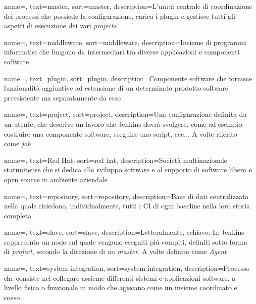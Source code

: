 {
    name=,
    text=master,
    sort=master,
    description={L'unità centrale di coordinazione dei processi che possiede la configurazione, carica i plugin e gestisce tutti gli aspetti di esecuzione dei vari \textit{projects}}
}

{
    name=,
    text=middleware,
    sort=middleware,
    description={Insieme di programmi informatici che fungono da intermediari tra diverse applicazioni e componenti software}
}

{
    name=,
    text=plugin,
    sort=plugin,
    description={Componente software che fornisce funzionalità aggiuntive ad estensione di un determinato prodotto software preesistente ma separatamente da esso}
}

{
    name=,
    text=project,
    sort=project,
    description={Una configurazione definita da un utente, che descrive un lavoro che Jenkins dovrà svolgere, come ad esempio costruire una componente software, eseguire uno script, ecc... A volte riferito come \textit{job}}
}

{
    name=,
    text=Red Hat,
    sort=red hat,
    description={Società multinazionale statunitense che si dedica allo sviluppo software e al supporto di software libero e open source in ambiente aziendale}
}

{
    name=,
    text=repository,
    sort=repository,
    description={Base di dati centralizzata nella quale risiedono, individualmente, tutti i \gls{CI} di ogni \gls{baseline} nella loro storia completa}
}

{
    name=,
    text=slave,
    sort=slave,
    description={Letteralmente, schiavo. In Jenkins rappresenta un nodo sul quale vengono eseguiti più compiti, definiti sotto forma di \textit{project}, secondo la direzione di un \textit{master}. A volte definito come \textit{Agent}}
}

{
    name=,
    text=system integration,
    sort=system integration,
    description={Processo che consiste nel collegare assieme differenti sistemi e applicazioni software, a livello fisico o funzionale in modo che agiscano come un insieme coordinato e coeso}
}